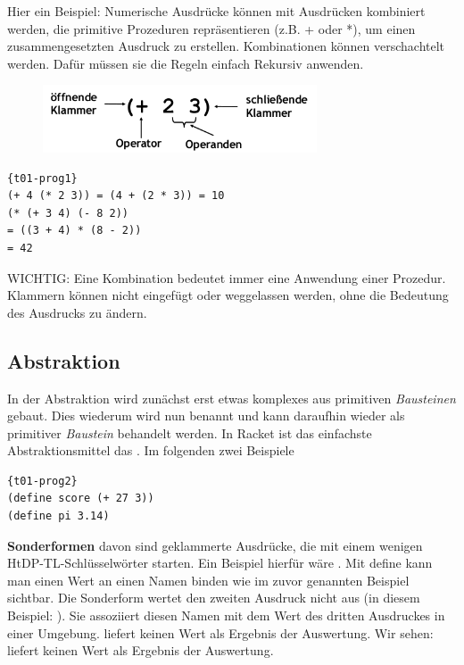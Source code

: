 Hier ein Beispiel:
Numerische Ausdrücke können mit Ausdrücken kombiniert werden, die primitive Prozeduren repräsentieren (z.B. + oder *), um einen zusammengesetzten Ausdruck zu erstellen. Kombinationen können verschachtelt werden. Dafür müssen sie die Regeln einfach Rekursiv anwenden.
\begin{figure}
	\begin{center}
		\includegraphics[height=2cm]{Bilder/T01_Sprachelemente_Kombination}
		\caption{}\label{t01_sk}
	\end{center}
\end{figure}

\begin{lstlisting}{t01-prog1}
(+ 4 (* 2 3)) = (4 + (2 * 3)) = 10
(* (+ 3 4) (- 8 2))
= ((3 + 4) * (8 - 2))
= 42
\end{lstlisting}

WICHTIG:
 Eine Kombination bedeutet immer eine Anwendung einer Prozedur. Klammern können nicht eingefügt oder weggelassen werden, ohne die Bedeutung des Ausdrucks zu ändern.

\subsection{Abstraktion}

In der Abstraktion wird zunächst erst etwas komplexes aus primitiven \textit{Bausteinen} gebaut. Dies wiederum wird nun benannt und kann daraufhin wieder als primitiver \textit{Baustein} behandelt werden. In Racket ist das einfachste Abstraktionsmittel das . Im folgenden zwei Beispiele

\begin{lstlisting}{t01-prog2}
(define score (+ 27 3))
(define pi 3.14)
\end{lstlisting}

\textbf{Sonderformen} davon sind geklammerte Ausdrücke, die mit einem wenigen HtDP-TL-Schlüsselwörter starten. Ein Beispiel hierfür wäre .  Mit define kann man einen Wert an einen Namen binden wie im zuvor genannten Beispiel sichtbar. Die  Sonderform wertet den zweiten Ausdruck nicht aus (in diesem Beispiel: ). Sie assoziiert diesen Namen mit dem Wert des dritten Ausdruckes in einer Umgebung.  liefert keinen Wert als Ergebnis der Auswertung. Wir sehen:  liefert keinen Wert als Ergebnis der Auswertung.

